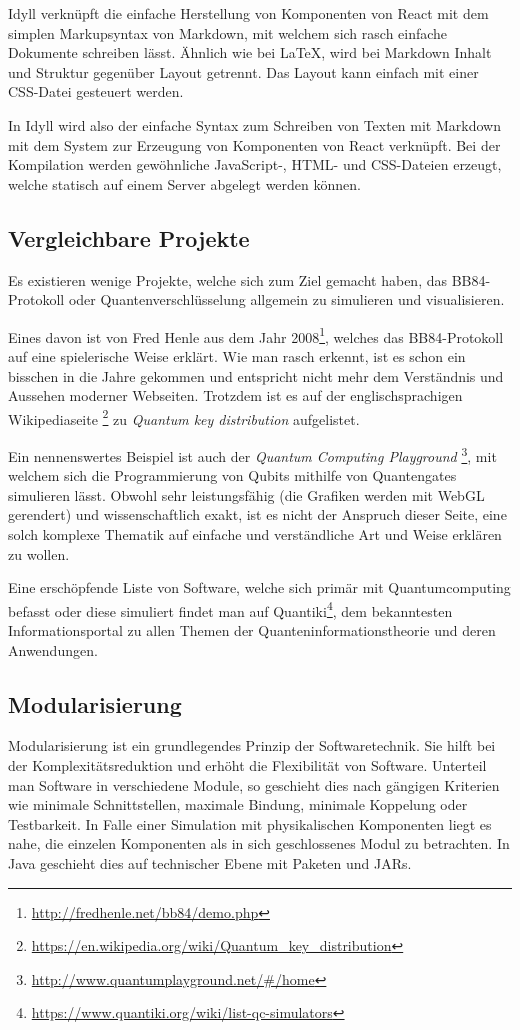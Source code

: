 \documentclass[a4paper,10.2pt,pdftex]{scrartcl}%
\begin{document}
Idyll verknüpft die einfache Herstellung von Komponenten von React mit dem simplen Markupsyntax von Markdown, mit welchem sich rasch einfache Dokumente schreiben lässt. Ähnlich wie bei LaTeX, wird bei Markdown Inhalt und Struktur gegenüber Layout getrennt. Das Layout kann einfach mit einer CSS-Datei gesteuert werden.

In Idyll wird also der einfache Syntax zum Schreiben von Texten mit Markdown mit dem System zur Erzeugung von Komponenten von React verknüpft. Bei der Kompilation werden gewöhnliche JavaScript-, HTML- und CSS-Dateien erzeugt, welche statisch auf einem Server abgelegt werden können.
\subsection{Vergleichbare Projekte}
Es existieren wenige Projekte, welche sich zum Ziel gemacht haben, das BB84-Protokoll oder Quantenverschlüsselung allgemein zu simulieren und visualisieren. 

Eines davon ist von Fred Henle aus dem Jahr 2008\footnote{\url{http://fredhenle.net/bb84/demo.php}}, welches das BB84-Protokoll auf eine spielerische Weise erklärt. Wie man rasch erkennt, ist es schon ein bisschen in die Jahre gekommen und entspricht nicht mehr dem Verständnis und Aussehen moderner Webseiten. Trotzdem ist es auf der englischsprachigen Wikipediaseite \footnote{\url{https://en.wikipedia.org/wiki/Quantum_key_distribution}} zu \emph{Quantum key distribution} aufgelistet.

Ein nennenswertes Beispiel ist auch der \emph{Quantum Computing Playground} \footnote{\url{http://www.quantumplayground.net/\#/home}}, mit welchem sich die Programmierung von Qubits mithilfe von Quantengates simulieren lässt. Obwohl sehr leistungsfähig (die Grafiken werden mit WebGL gerendert) und wissenschaftlich exakt, ist es nicht der Anspruch dieser Seite, eine solch komplexe Thematik auf einfache und verständliche Art und Weise erklären zu wollen.

Eine erschöpfende Liste von Software, welche sich primär mit Quantumcomputing befasst oder diese simuliert findet man auf Quantiki\footnote{\url{https://www.quantiki.org/wiki/list-qc-simulators}}, dem bekanntesten Informationsportal zu allen Themen der Quanteninformationstheorie und deren Anwendungen.

\subsection{Modularisierung}
Modularisierung ist ein grundlegendes Prinzip der Softwaretechnik. Sie hilft bei der Komplexitätsreduktion und erhöht die Flexibilität von Software. Unterteil man Software in verschiedene Module, so geschieht dies nach gängigen Kriterien wie minimale Schnittstellen, maximale Bindung, minimale Koppelung oder Testbarkeit. In Falle einer Simulation mit physikalischen Komponenten liegt es nahe, die einzelen Komponenten als in sich geschlossenes Modul zu betrachten. In Java geschieht dies auf technischer Ebene mit Paketen und JARs. 
\end{document}
